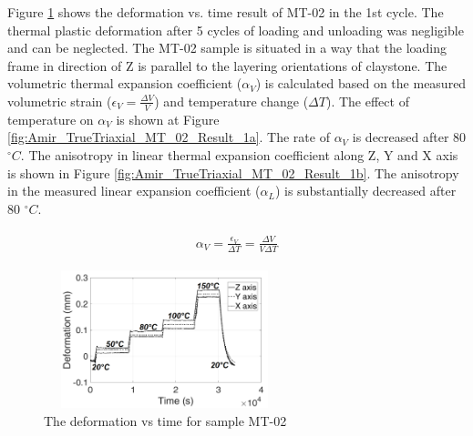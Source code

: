  Figure \ref{fig:Amir_TrueTriaxial_MT_02_Result} shows the deformation vs. time result of MT-02 in the 1st cycle. The thermal plastic deformation after 5 cycles of loading and unloading was negligible and can be neglected. The MT-02 sample is situated in a way that the loading frame in direction of Z is parallel to the layering orientations of claystone. The volumetric thermal expansion coefficient ($\alpha_V$) is calculated based on the measured volumetric strain ($\epsilon_V=\frac{\Delta V}{V}$) and temperature change ($\Delta T$). The effect of temperature on $\alpha_V$ is shown at Figure \ref{fig:Amir_TrueTriaxial_MT_02_Result_1a}. The rate of $\alpha_V$ is decreased after 80 $^{\circ}C$. The anisotropy in linear thermal expansion coefficient along Z, Y and X axis is shown in Figure \ref{fig:Amir_TrueTriaxial_MT_02_Result_1b}. The anisotropy in the measured linear expansion coefficient ($\alpha_L$) is substantially decreased after 80 $^{\circ}C$.

\begin{align}
\label{eq:ThermalExpansion}
\begin{split}
\alpha_V=\frac{\epsilon_V}{\Delta T}=\frac{\Delta V}{V\Delta T}
\end{split}
\end{align}

\begin{figure}[!ht]
\centering
\includegraphics[width=7cm,height=4cm]{figures/Amir_TrueTriaxial_MT_02_Result.png}
\caption{The deformation vs time for sample MT-02}
\label{fig:Amir_TrueTriaxial_MT_02_Result}
\end{figure} 

